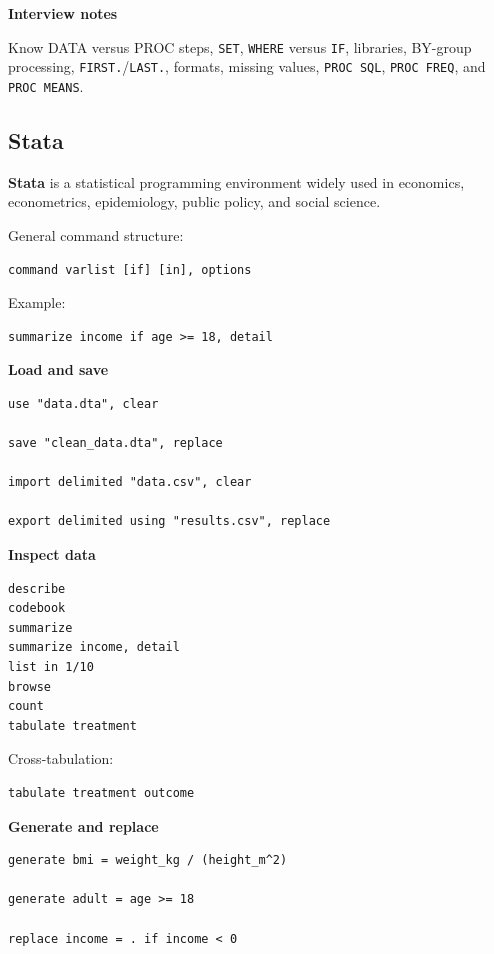 \documentclass[11pt,letterpaper]{article}
\begin{document}
\textbf{Interview notes}

Know DATA versus PROC steps, \texttt{SET}, \texttt{WHERE} versus
\texttt{IF}, libraries, BY-group processing, \texttt{FIRST.}/\texttt{LAST.},
formats, missing values, \texttt{PROC SQL}, \texttt{PROC FREQ}, and
\texttt{PROC MEANS}.



\subsection{Stata}

\textbf{Stata} is a statistical programming environment widely used in
economics, econometrics, epidemiology, public policy, and social science.

General command structure:

\begin{lstlisting}
command varlist [if] [in], options
\end{lstlisting}

Example:

\begin{lstlisting}
summarize income if age >= 18, detail
\end{lstlisting}

\textbf{Load and save}

\begin{lstlisting}
use "data.dta", clear

save "clean_data.dta", replace

import delimited "data.csv", clear

export delimited using "results.csv", replace
\end{lstlisting}

\textbf{Inspect data}

\begin{lstlisting}
describe
codebook
summarize
summarize income, detail
list in 1/10
browse
count
tabulate treatment
\end{lstlisting}

Cross-tabulation:

\begin{lstlisting}
tabulate treatment outcome
\end{lstlisting}

\textbf{Generate and replace}

\begin{lstlisting}
generate bmi = weight_kg / (height_m^2)

generate adult = age >= 18

replace income = . if income < 0
\end{lstlisting}
\end{document}
